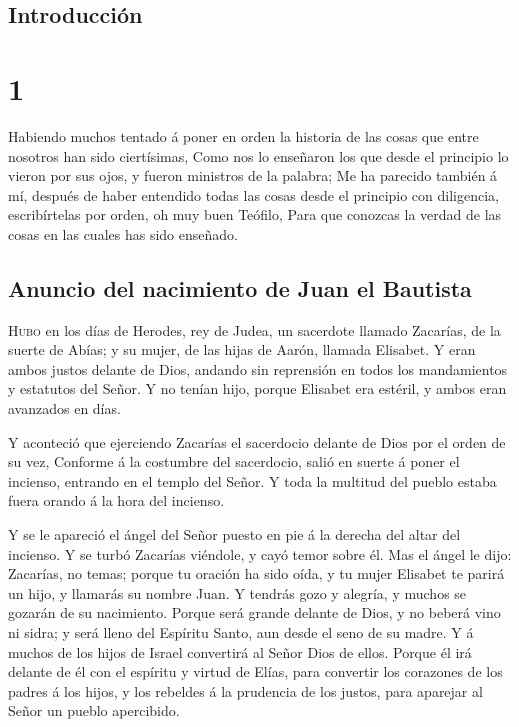 \hypertarget{introducciuxf3n}{%
\subsection{Introducción}\label{introducciuxf3n}}

\hypertarget{section}{%
\section{1}\label{section}}

 Habiendo muchos tentado á poner en orden la historia de
las cosas que entre nosotros han sido ciertísimas,  Como
nos lo enseñaron los que desde el principio lo vieron por sus ojos, y
fueron ministros de la palabra;  Me ha parecido también á
mí, después de haber entendido todas las cosas desde el principio con
diligencia, escribírtelas por orden, oh muy buen Teófilo, 
Para que conozcas la verdad de las cosas en las cuales has sido
enseñado.

\hypertarget{anuncio-del-nacimiento-de-juan-el-bautista}{%
\subsection{Anuncio del nacimiento de Juan el
Bautista}\label{anuncio-del-nacimiento-de-juan-el-bautista}}

 \textsc{Hubo} en los días de Herodes, rey de Judea, un
sacerdote llamado Zacarías, de la suerte de Abías; y su mujer, de las
hijas de Aarón, llamada Elisabet.  Y eran ambos justos
delante de Dios, andando sin reprensión en todos los mandamientos y
estatutos del Señor.  Y no tenían hijo, porque Elisabet
era estéril, y ambos eran avanzados en días.

 Y aconteció que ejerciendo Zacarías el sacerdocio delante
de Dios por el orden de su vez,  Conforme á la costumbre
del sacerdocio, salió en suerte á poner el incienso, entrando en el
templo del Señor.  Y toda la multitud del pueblo estaba
fuera orando á la hora del incienso.

 Y se le apareció el ángel del Señor puesto en pie á la
derecha del altar del incienso.  Y se turbó Zacarías
viéndole, y cayó temor sobre él.  Mas el ángel le dijo:
Zacarías, no temas; porque tu oración ha sido oída, y tu mujer Elisabet
te parirá un hijo, y llamarás su nombre Juan.  Y tendrás
gozo y alegría, y muchos se gozarán de su nacimiento. 
Porque será grande delante de Dios, y no beberá vino ni sidra; y será
lleno del Espíritu Santo, aun desde el seno de su madre. 
Y á muchos de los hijos de Israel convertirá al Señor Dios de ellos.
 Porque él irá delante de él con el espíritu y virtud de
Elías, para convertir los corazones de los padres á los hijos, y los
rebeldes á la prudencia de los justos, para aparejar al Señor un pueblo
apercibido.

